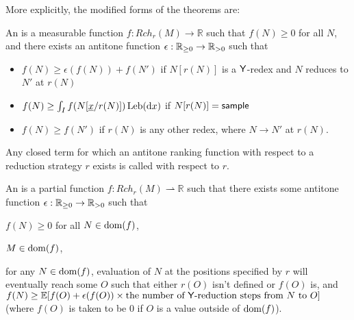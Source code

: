 More explicitly, the modified forms of the theorems are:
\begin{definition}
An  is a measurable function $f:\mathit{Rch}_r(M) \to \mathbb{R}$ such that $f(N) \geq 0$ for all $N$, and there exists an antitone function $\epsilon : \mathbb{R}_{{\geq}0} \to \mathbb{R}_{{>}0}$ such that
\begin{itemize}
    \item $f(N) \geq \epsilon(f(N)) + f(N')$ if $N[r(N)]$ is a $\mathsf{Y}$-redex and $N$ reduces to $N'$ at $r(N)$
    \item $f(N) \geq \int_I f(N[\underline{x}/r(N)]) \, \mathrm{Leb}(\mathrm{d}x)$ if $N[r(N)] = \mathsf{sample}$

    \item $f(N) \geq f(N')$ if $r(N)$ is any other redex, where $N \to N'$ at $r(N)$.
\end{itemize}
Any closed term for which an antitone ranking function with respect to a reduction strategy $r$ exists is called  with respect to $r$. 
\end{definition}

\begin{definition}
An  is a partial function $f : \mathit{Rch}_r(M) \rightharpoonup \mathbb R$ such that there exists some antitone function $\epsilon : \mathbb{R}_{{\geq}0} \to \mathbb{R}_{{>}0}$ such that
\begin{inparaenum}[(i)]
    \item $f(N) \geq 0$ for all $N \in \operatorname{dom}(f)$,
    \item $M \in \operatorname{dom}(f)$,
    \item for any $N \in \operatorname{dom}(f)$, evaluation of $N$ at the positions specified by $r$ will eventually reach some $O$ such that either $r(O)$ isn't defined or $f(O)$ is, and $f(N) \geq \mathbb E[f(O) + \epsilon(f(O)) \times \text{the number of $\tY$-reduction steps from $N$ to $O$}]$ (where $f(O)$ is taken to be 0 if $O$ is a value outside of $\operatorname{dom}(f)$).
\end{inparaenum}
\iffalse
\begin{itemize}
    \item $f(N) \geq 0$ for all $N$ where $f$ is defined.
    \item $f$ is defined at $M$.
    \item For any $N$ in the domain of definition of $f$, evaluation of $N$ at the positions specified by $r$ will eventually reach some $O$ such that either $r(O)$ isn't defined or $f(O)$ is, and $f(N) \geq \mathbb E[f(O) + \epsilon(f(O)) \times \text{the number of $\tY$-reduction steps from $N$ to $O$}]$ (where $f(O)$ is taken to be 0 if $O$ is a value outside of the domain of $f$).
\end{itemize}
\fi
\end{definition}

